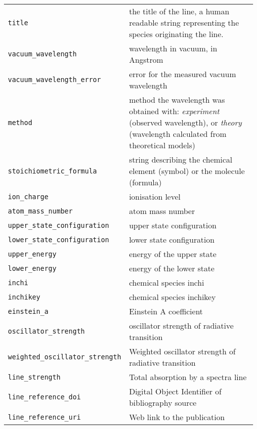 \documentclass[11pt,a4paper]{ivoa}
\begin{document}
\begin{table}[H]
\begin{center}
\begin{tabular}{l p{8cm}}%
\texttt{title} & the title of the line, a human readable string representing the species originating  the line.  \\
\texttt{vacuum\_wavelength} & wavelength in vacuum, in Angstrom \\
\texttt{vacuum\_wavelength\_error} & error for the measured vacuum wavelength \\
\texttt{method} & method the wavelength was obtained with: \textit{experiment} (observed wavelength), or \textit{theory} (wavelength calculated from theoretical models) \\ 
\texttt{stoichiometric\_formula} & string describing the chemical element (symbol) or the molecule (formula) \\
\texttt{ion\_charge} & ionisation level\\
\texttt{atom\_mass\_number} & atom mass number\\
\texttt{upper\_state\_configuration} & upper state configuration\\
\texttt{lower\_state\_configuration} & lower state configuration\\
\texttt{upper\_energy} & energy of the upper state \\
\texttt{lower\_energy} & energy of the lower state\\
\texttt{inchi} & chemical species inchi \\
\texttt{inchikey} & chemical species inchikey \\
\texttt{einstein\_a} & Einstein A coefficient\\
\texttt{oscillator\_strength} & oscillator strength of radiative transition \\
\texttt{weighted\_oscillator\_strength} &  Weighted oscillator strength of radiative transition \\
\texttt{line\_strength} & Total absorption by a spectra line \\
\texttt{line\_reference\_doi} & Digital Object Identifier of bibliography source \\
\texttt{line\_reference\_uri} & Web link to the publication\\
\end{tabular}

\end{center}
\end{table}
\end{document}
